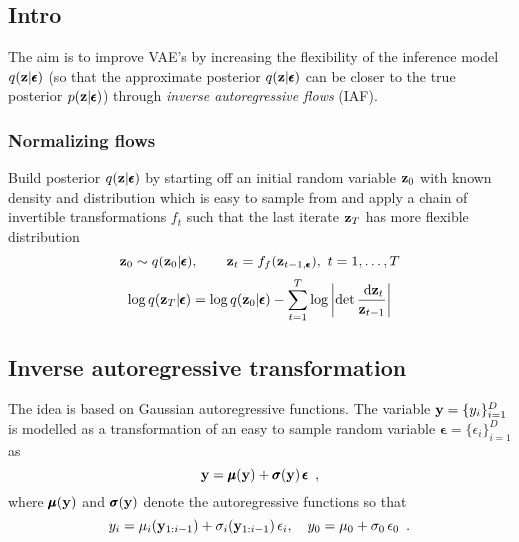 \subsection{Intro}

The aim is to improve VAE's by increasing the flexibility of the inference model $q(\mathbf{z} \vert \pmb{\epsilon})$ (so that the approximate posterior $q(\mathbf{z} \vert \pmb{\epsilon})$ can be closer to the true posterior $p(\mathbf{z} \vert \pmb{\epsilon})$) through \emph{inverse autoregressive flows} (IAF).

\subsubsection{Normalizing flows}

Build posterior $q(\mathbf{z} \vert \pmb{\epsilon})$ by starting off an initial random variable $\mathbf{z}_0$ with known density and distribution which is easy to sample from and apply a chain of invertible transformations $f_t$ such that the last iterate $\mathbf{z}_T$ has more flexible distribution
\begin{equation}
\mathbf{z}_0 \sim q(\mathbf{z}_0 \vert \pmb{\epsilon}), \qquad \mathbf{z}_t = f_f(\mathbf{z}_{t-1, \pmb{\epsilon}}), \ t=1, \ldots, T
\end{equation}
\begin{equation}
\log  q(\mathbf{z}_T \vert \pmb{\epsilon}) = \log q(\mathbf{z}_0 \vert \pmb{\epsilon}) - \sum_{t=1}^T \log \left\lvert \det \frac{\; \text{d} \mathbf{z}_t}{\mathbf{z}_{t-1}} \right\rvert
\end{equation} 

\subsection{Inverse autoregressive transformation}

The idea is based on Gaussian autoregressive functions. The variable $\mathbf{y} = \{y_i\}_{i=1}^D$ is modelled as a transformation of an easy to sample random variable $\pmb{\epsilon} = \{\epsilon_i\}_{i=1}^D$ as
\begin{equation}
\mathbf{y} = \pmb{\mu}(\mathbf{y}) + \pmb{\sigma}(\mathbf{y}) \, \pmb{\epsilon} \enspace ,
\end{equation}
where $\pmb{\mu}(\mathbf{y})$ and $\pmb{\sigma}(\mathbf{y})$ denote the autoregressive functions so that
\begin{equation}
y_i = \mu_i(\mathbf{y}_{1:i-1}) + \sigma_i(\mathbf{y}_{1:i-1}) \, \epsilon_i, \quad y_0 = \mu_0 + \sigma_0 \, \epsilon_0 \enspace .
\end{equation}


